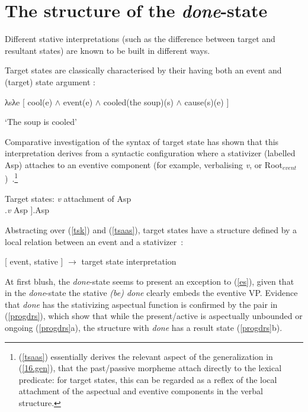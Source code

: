 \documentclass[output=paper,modfonts,nonflat]{langsci/langscibook}
\newcommand{\ro}[1]{$\sqrt{\mbox{\sc {#1}}}$}
\begin{document}
\section{The structure of the \emph{done}-state} \label{ssyn}

Different stative interpretations (such as the difference between target and
resultant states) are known to be built in different ways.

Target states are classically characterised by their having both an event and
(target) state argument \parencite{Kratzer2001a}:

\begin{exe}
\ex\label{tsk} λsλe [ cool(e) $\wedge$ event(e) $\wedge$ cooled(the soup)(s) $\wedge$ cause(s)(e) ]
\par `The soup is cooled' \hfill \parencite[391]{Kratzer2001a}
\end{exe}

Comparative investigation of the syntax of target state  has shown
that this interpretation derives from a syntactic configuration where a
stativizer (labelled Asp) attaches to an eventive component (for example,
verbalising \emph{v}, or Root$_{event}$)~\citep{Alexiadou2008a, Embick2009a,
    Anagnostopoulou2013a, AlexiadouEtAl2015}.\footnote{(\ref{tsaas}) essentially
    derives the relevant aspect of the generalization in (\ref{16.gen}), that
    the past/passive morpheme attach directly to the lexical predicate: for
    target states, this can be regarded as a reflex of the local attachment of
the aspectual and eventive components in the verbal structure.}


\begin{exe}
\ex\label{tsaas} Target states: \emph{v} attachment of Asp\\
\vspace{11pt}
\Tree  [  [  \ro{\dots}  {\dots} ].\emph{v}  Asp ].Asp
\end{exe}

Abstracting over (\ref{tsk}) and (\ref{tsaas}), target states have a structure
defined by a local relation between an event and a
stativizer~\citep{Kratzer2001a, Alexiadou2008a, Embick2009a}:

\begin{exe}
\ex\label{es} {[ event, stative ]} $\rightarrow$ target state interpretation
\end{exe}


At first blush, the \emph{done}-state seems to present an exception to
(\ref{es}), given that in the \emph{done}-state the stative \emph{(be) done}
clearly embeds the eventive VP\@. Evidence that \emph{done} has the stativizing
aspectual function is confirmed by the pair in (\ref{progdrs}), which show that
while the present\slash active is aspectually unbounded or ongoing (\ref{progdrs}a),
the structure with \emph{done} has a result state (\ref{progdrs}b).
\end{document}
